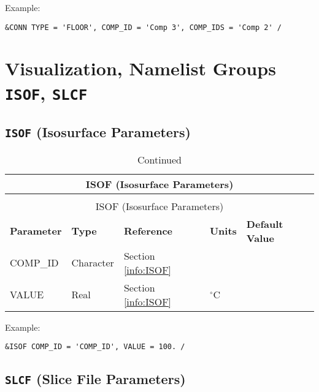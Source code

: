 \vspace{\baselineskip}
\noindent Example:
\begin{lstlisting}
&CONN TYPE = 'FLOOR', COMP_ID = 'Comp 3', COMP_IDS = 'Comp 2' /
\end{lstlisting}




\clearpage
\section{Visualization, Namelist Groups \texorpdfstring{{\tt ISOF}}{ISOF}, \texorpdfstring{{\tt SLCF}}{SLCF}}

\subsection{\texorpdfstring{{\tt ISOF}}{ISOF} (Isosurface Parameters)}

\begin{longtable}{@{\extracolsep{\fill}}|l|l|l|l|l|}
\caption[Isosurface parameters ({\ct ISOF} namelist group)]{For more information see Section~\ref{info:ISOF}.}
\label{tbl:ISOF} \\
\hline
\multicolumn{5}{|c|}{{\ct ISOF} (Isosurface Parameters)} \\
\hline \hline
\endfirsthead
\caption[]{Continued} \\
\hline
\multicolumn{5}{|c|}{{\ct ISOF} (Isosurface Parameters)} \\
\hline \hline
\endhead
\parbox{1.5in}{\bf Parameter}    & \parbox{1in}{\bf Type}  & \parbox{1in}{\bf Reference}  & \parbox{1in}{\bf Units}  & \parbox{1in}{\bf Default Value} \\ \hline
{\ct COMP\_ID}          & Character   & Section \ref{info:ISOF}                 &           &                 \\ \hline
{\ct VALUE}             & Real        & Section \ref{info:ISOF}                 & $^\circ$C &                 \\ \hline
\end{longtable}

\noindent Example:
\begin{lstlisting}
&ISOF COMP_ID = 'COMP_ID', VALUE = 100. /
\end{lstlisting}




\subsection{\texorpdfstring{{\tt SLCF}}{SLCF} (Slice File Parameters)}

